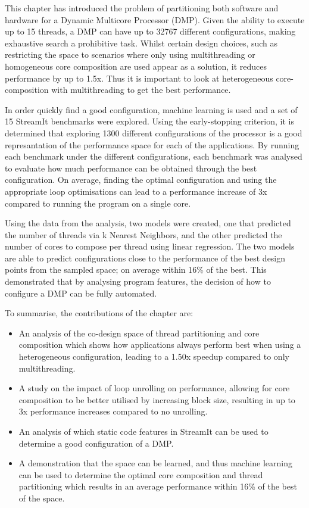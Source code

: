 This chapter has introduced the problem of partitioning both software and hardware for a Dynamic Multicore Processor (DMP).
Given the ability to execute up to 15 threads, a DMP can have up to 32767 different configurations, making exhaustive search a prohibitive task.
Whilst certain design choices, such as restricting the space to scenarios where only using multithreading or homogeneous core composition are used appear as a solution, it reduces performance by up to 1.5x.
Thus it is important to look at heterogeneous core-composition with multithreading to get the best performance.

In order quickly find a good configuration, machine learning is used and a set of 15 StreamIt benchmarks were explored.
Using the early-stopping criterion, it is determined that exploring 1300 different configurations of the processor is a good represantation of the performance space for each of the applications.
By running each benchmark under the different configurations, each benchmark was analysed to evaluate how much performance can be obtained through the best configuration.
On average, finding the optimal configuration and using the appropriate loop optimisations can lead to a performance increase of 3x compared to running the program on a single core.

Using the data from the analysis, two models were created, one that predicted the number of threads via k Nearest Neighbors, and the other predicted the number of cores to compose per thread using linear regression.
The two models are able to predict configurations close to the performance of the best design points from the sampled space; on average within 16\% of the best.
This demonstrated that by analysing program features, the decision of how to configure a DMP can be fully automated.

To summarise, the contributions of the chapter are:
\begin{itemize}
\item An analysis of the co-design space of thread partitioning and core composition which shows how applications always perform best when using a heterogeneous configuration, leading to a 1.50x speedup compared to only multithreading.
\vspace{-0.5em}
\item A study on the impact of loop unrolling on performance, allowing for core composition to be better utilised by increasing block size, resulting in up to 3x performance increases compared to no unrolling.
\vspace{-0.5em}
\item An analysis of which static code features in StreamIt can be used to determine a good configuration of a DMP.
\vspace{-0.5em}
\item A demonstration that the space can be learned, and thus machine learning can be used to determine the optimal core composition and thread partitioning which results in an average performance within 16\% of the best of the space.
\end{itemize}

